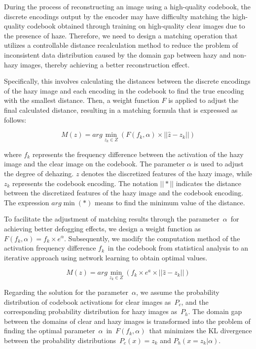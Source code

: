 \documentclass[lettersize,journal]{IEEEtran}
\begin{document}
During the process of reconstructing an image using a high-quality codebook, the discrete encodings output by the encoder may have difficulty matching the high-quality codebook obtained through training on high-quality clear images due to the presence of haze. Therefore, we need to design a matching operation that utilizes a controllable distance recalculation method to reduce the problem of inconsistent data distribution caused by the domain gap between hazy and non-hazy images, thereby achieving a better reconstruction effect.

Specifically, this involves calculating the distances between the discrete encodings of the hazy image and each encoding in the codebook to find the true encoding with the smallest distance. Then, a weight function $F$ is applied to adjust the final calculated distance, resulting in a matching formula that is expressed as follows:

\begin{equation}
	\label{codebook_matching_equation_2}
	M(z) = arg \min_{z_{k} \in Z} (F(f_{k}, \alpha) \times || \widehat{z} - z_{k} ||)
\end{equation}

\noindent where $f_{k}$ represents the frequency difference between the activation of the hazy image and the clear image on the codebook. The parameter $ \alpha $ is used to adjust the degree of dehazing. $z$ denotes the discretized features of the hazy image, while $z_{k}$ represents the codebook encoding. The notation $||*||$ indicates the distance between the discretized features of the hazy image and the codebook encoding. The expression $arg \min(*)$ means to find the minimum value of the distance.


To facilitate the adjustment of matching results through the parameter $\alpha$ for achieving better defogging effects, we design a weight function as $F(f_{k}, \alpha) = f_{k} \times e^{\alpha} $. Subsequently, we modify the computation method of the activation frequency difference $f_{k}$ in the codebook from statistical analysis to an iterative approach using network learning to obtain optimal values.

\begin{equation}
	\label{codebook_matching_equation_1}
	M(z) = arg \min_{z_{k} \in Z} (f_{k} \times e^{a} \times || \widehat{z} - z_{k} ||)
\end{equation}

Regarding the solution for the parameter $\alpha$, we assume the probability distribution of codebook activations for clear images as $P_{c}$, and the corresponding probability distribution for hazy images as $P_{h}$. The domain gap between the domains of clear and hazy images is transformed into the problem of finding the optimal parameter $\alpha$ in $F(f_{k}, \alpha)$ that minimizes the KL divergence between the probability distributions $P_{c}(x) = z_{k}$ and $P_{h}(x = z_{k} | \alpha) $.
\end{document}
